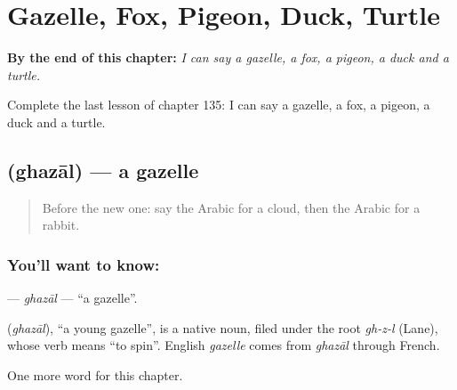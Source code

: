 
\chapter{Gazelle, Fox, Pigeon, Duck, Turtle}
\label{ch:ar-gazelle-fox-pigeon-duck-turtle}

\begin{chapteropening}
\textbf{By the end of this chapter:} \emph{I can say a gazelle, a fox, a pigeon, a duck and a turtle.}

Complete the last lesson of chapter 135: I can say a gazelle, a fox, a pigeon, a duck and a turtle.
\end{chapteropening}

\section[\texorpdfstring{\ar{غزال} (ghazāl)}{غزال (ghazāl)}]{ (ghazāl) — a gazelle}

\label{lesson:AR-C135-ghazal}



\begin{quote}
Before the new one: say the Arabic for a cloud, then the Arabic for a rabbit.
\end{quote}

\subsection*{You'll want to know: }
\textbf{} — \emph{ghazāl} — \textquotedblleft{}a gazelle\textquotedblright{}.

\begin{cousinweb}
\textbf{} (\emph{ghazāl}), \textquotedblleft{}a young gazelle\textquotedblright{}, is a native noun, filed under the root \emph{gh-z-l} (Lane), whose verb means \textquotedblleft{}to spin\textquotedblright{}. English \emph{gazelle} comes from \emph{ghazāl} through French.
\end{cousinweb}

\begin{grammarlens}[title={What you've built}]
One more word for this chapter.
\end{grammarlens}


